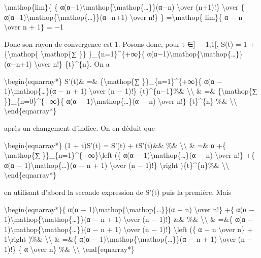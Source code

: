 \documentclass[]{article}
\begin{document}
\textbackslash{}mathop\{lim\}\{ \{
α(α−1)\textbackslash{}mathop\{\textbackslash{}mathop\{\ldots{}\}\}(α−n)
\textbackslash{}over (n+1)!\} \textbackslash{}over \{
α(α−1)\textbackslash{}mathop\{\textbackslash{}mathop\{\ldots{}\}\}(α−n+1)
\textbackslash{}over n!\} \} =\textbackslash{}mathop\{ lim\}\{ α − n
\textbackslash{}over n + 1\} = −1

Donc son rayon de convergence est 1. Posons donc, pour t ∈{]} − 1,1{[},
S(t) = 1 +\{\textbackslash{}mathop\{ \textbackslash{}mathop\{∑ \}\}
\}\_\{n=1\}\^{}\{+∞\}\{
α(α−1)\textbackslash{}mathop\{\textbackslash{}mathop\{\ldots{}\}\}(α−n+1)
\textbackslash{}over n!\} \{t\}\^{}\{n\}. On a

\textbackslash{}begin\{eqnarray*\} S'(t)\& =\&
\{\textbackslash{}mathop\{∑ \}\}\_\{n=1\}\^{}\{+∞\}\{ α(α −
1)\textbackslash{}mathop\{\ldots{}\}(α − n + 1) \textbackslash{}over (n
− 1)!\} \{t\}\^{}\{n−1\}\%\& \textbackslash{}\textbackslash{} \& =\&
\{\textbackslash{}mathop\{∑ \}\}\_\{n=0\}\^{}\{+∞\}\{ α(α −
1)\textbackslash{}mathop\{\ldots{}\}(α − n) \textbackslash{}over n!\}
\{t\}\^{}\{n\} \%\& \textbackslash{}\textbackslash{}
\textbackslash{}end\{eqnarray*\}

après un changement d'indice. On en déduit que

\textbackslash{}begin\{eqnarray*\} (1 + t)S'(t) = S'(t) + tS'(t)\&\&
\%\& \textbackslash{}\textbackslash{} \& =\& α +\{
\textbackslash{}mathop\{∑ \}\}\_\{n=1\}\^{}\{+∞\}\textbackslash{}left
(\{ α(α − 1)\textbackslash{}mathop\{\ldots{}\}(α − n)
\textbackslash{}over n!\} +\{ α(α −
1)\textbackslash{}mathop\{\ldots{}\}(α − n + 1) \textbackslash{}over (n
− 1)!\} \textbackslash{}right )\{t\}\^{}\{n\}\%\&
\textbackslash{}\textbackslash{} \textbackslash{}end\{eqnarray*\}

en utilisant d'abord la seconde expression de S'(t) puis la première.
Mais

\textbackslash{}begin\{eqnarray*\}\{ α(α −
1)\textbackslash{}mathop\{\textbackslash{}mathop\{\ldots{}\}\}(α − n)
\textbackslash{}over n!\} +\{ α(α −
1)\textbackslash{}mathop\{\textbackslash{}mathop\{\ldots{}\}\}(α − n +
1) \textbackslash{}over (n − 1)!\} \&\& \%\&
\textbackslash{}\textbackslash{} \& =\&\{ α(α −
1)\textbackslash{}mathop\{\textbackslash{}mathop\{\ldots{}\}\}(α − n +
1) \textbackslash{}over (n − 1)!\} \textbackslash{}left (\{ α − n
\textbackslash{}over n\} + 1\textbackslash{}right )\%\&
\textbackslash{}\textbackslash{} \& =\&\{ α(α −
1)\textbackslash{}mathop\{\textbackslash{}mathop\{\ldots{}\}\}(α − n +
1) \textbackslash{}over (n − 1)!\} \{ α \textbackslash{}over n\} \%\&
\textbackslash{}\textbackslash{} \textbackslash{}end\{eqnarray*\}
\end{document}
